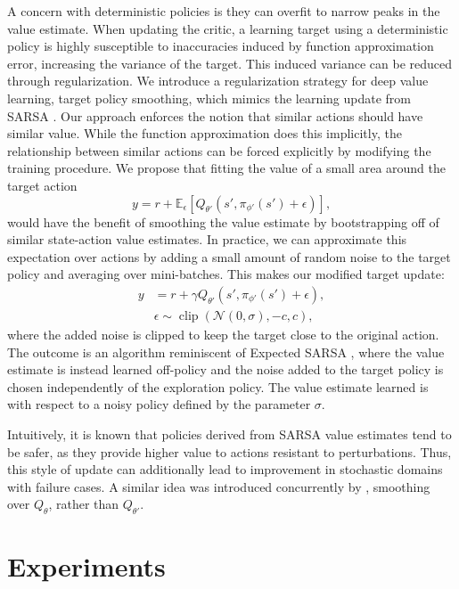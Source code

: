 \documentclass{article}
\newcommand{\e}{\epsilon}
\newcommand{\y}{\gamma}
\newcommand{\s}{\sigma}
\newcommand{\E}{\mathbb{E}}
\newcommand{\N}{\mathcal{N}}
\newcommand{\lb}{\left [}
\newcommand{\rb}{\right ]}
\DeclareMathOperator*{\clip}{clip}
\begin{document}
A concern with deterministic policies is they can overfit to narrow peaks in the value estimate. When updating the critic, a learning target using a deterministic policy is highly susceptible to inaccuracies induced by function approximation error, increasing the variance of the target. This induced variance can be reduced through regularization. We introduce a regularization strategy for deep value learning, target policy smoothing, which mimics the learning update from SARSA \cite{sutton1998reinforcement}. Our approach enforces the notion that similar actions should have similar value. While the function approximation does this implicitly, the relationship between similar actions can be forced explicitly by modifying the training procedure. We propose that fitting the value of a small area around the target action
\begin{equation}
y = r + \E_{\e} \lb Q_{\theta'}(s',  \pi_{\phi'}(s') + \e) \rb,
\end{equation}
would have the benefit of smoothing the value estimate by bootstrapping off of similar state-action value estimates. In practice, we can approximate this expectation over actions by adding a small amount of random noise to the target policy and averaging over mini-batches. This makes our modified target update: 
\begin{equation}
\begin{aligned}
y &= r + \y Q_{\theta'}(s', \pi_{\phi'}(s') + \e), \\
& \e \sim \clip(\N(0, \s), -c, c),
\end{aligned}
\end{equation}
where the added noise is clipped to keep the target close to the original action. 
The outcome is an algorithm reminiscent of Expected SARSA \cite{van2009theoretical}, where the value estimate is instead learned off-policy and the noise added to the target policy is chosen independently of the exploration policy.
The value estimate learned is with respect to a noisy policy defined by the parameter $\s$. 

Intuitively, it is known that policies derived from SARSA value estimates tend to be safer, as they provide higher value to actions resistant to perturbations. Thus, this style of update can additionally lead to improvement in stochastic domains with failure cases. A similar idea was introduced concurrently by \citet{Smoothie}, smoothing over $Q_\theta$, rather than $Q_{\theta'}$. 

\section{Experiments}
\end{document}
